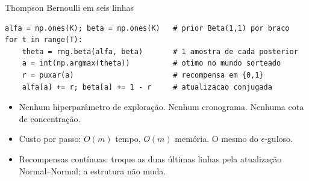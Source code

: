 \documentclass[aspectratio=169, 11pt]{beamer}
\begin{document}
\begin{frame}[fragile]{Thompson Bernoulli em seis linhas}
\small
\begin{verbatim}
alfa = np.ones(K); beta = np.ones(K)   # prior Beta(1,1) por braco
for t in range(T):
    theta = rng.beta(alfa, beta)       # 1 amostra de cada posterior
    a = int(np.argmax(theta))          # otimo no mundo sorteado
    r = puxar(a)                       # recompensa em {0,1}
    alfa[a] += r; beta[a] += 1 - r     # atualizacao conjugada
\end{verbatim}
\normalsize

  \begin{itemize}
    \item Nenhum hiperparâmetro de exploração. Nenhum cronograma. Nenhuma
          cota de concentração.
    \item Custo por passo: $O(m)$ tempo, $O(m)$ memória. O mesmo do
          $\epsilon$-guloso.
    \item Recompensas contínuas: troque as duas últimas linhas pela
          atualização Normal--Normal; a estrutura não muda.
  \end{itemize}
\end{frame}
\end{document}
